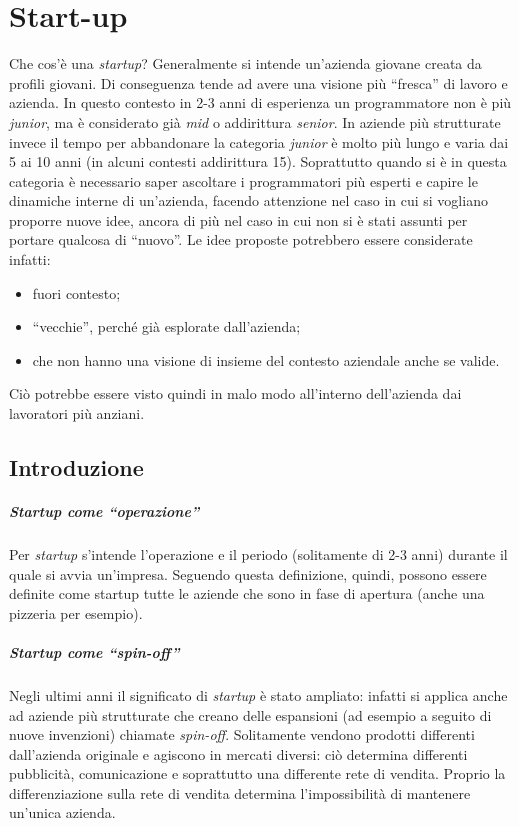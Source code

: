 \chapter{Start-up}

Che cos'è una \textit{startup}? Generalmente si intende un'azienda giovane
creata da profili giovani. Di conseguenza tende ad avere una visione più
``fresca'' di lavoro e azienda. In questo contesto in 2-3 anni di esperienza
un programmatore non è più \textit{junior}, ma è considerato già \textit{mid}
o addirittura \textit{senior}. In aziende più strutturate invece il tempo
per abbandonare la categoria \textit{junior} è molto più lungo e varia dai 5
ai 10 anni (in alcuni contesti addirittura 15). Soprattutto quando si è in
questa categoria è necessario saper ascoltare i programmatori più esperti e
capire le dinamiche interne di un'azienda, facendo attenzione nel caso in
cui si vogliano proporre nuove idee, ancora di più nel caso in cui non si è
stati assunti per portare qualcosa di ``nuovo''. Le idee proposte potrebbero
essere considerate infatti:
\begin{itemize}
  \item fuori contesto;
  \item ``vecchie'', perché già esplorate dall'azienda;
  \item che non hanno una visione di insieme del contesto aziendale anche se
  valide.
\end{itemize}
Ciò potrebbe essere visto quindi in malo modo all'interno dell'azienda dai
lavoratori più anziani.

\section{Introduzione}

\paragraph*{Startup come ``operazione''} Per \textit{startup} s'intende
l'operazione e il periodo (solitamente di 2-3 anni) durante il quale si avvia
un'impresa. Seguendo questa definizione, quindi, possono essere definite come
startup tutte le aziende che sono in fase di apertura (anche una pizzeria per
esempio).

\paragraph*{Startup come ``spin-off''}
Negli ultimi anni il significato di \textit{startup} è stato ampliato: infatti
si applica anche ad aziende più strutturate che creano delle espansioni (ad
esempio a seguito di nuove invenzioni) chiamate \textit{spin-off}. Solitamente
vendono prodotti differenti dall'azienda originale e agiscono in mercati
diversi: ciò determina differenti pubblicità, comunicazione e soprattutto
una differente rete di vendita. Proprio la differenziazione sulla rete di
vendita determina l'impossibilità di mantenere un'unica azienda.

